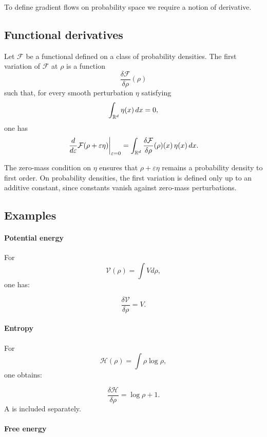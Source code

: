 To define gradient flows on probability space we require a notion of derivative.

\subsection{Functional derivatives}

\begin{definition}
Let $\mathcal F$ be a functional defined on a class of probability densities.
The first variation of $\mathcal F$ at $\rho$ is a function
\[
\frac{\delta \mathcal F}{\delta \rho}(\rho)
\]
such that, for every smooth perturbation $\eta$ satisfying
\[
\int_{\mathbb{R}^d}\eta(x)\,dx=0,
\]
one has
\[
\left.
\frac{d}{d\varepsilon}
\mathcal F(\rho+\varepsilon\eta)
\right|_{\varepsilon=0}
=
\int_{\mathbb{R}^d}
\frac{\delta \mathcal F}{\delta \rho}(\rho)(x)\,\eta(x)\,dx.
\]
\end{definition}

The zero-mass condition on $\eta$ ensures that $\rho+\varepsilon\eta$ remains a probability density to first order.
On probability densities, the first variation is defined only up to an additive constant, since constants vanish against zero-mass perturbations.

\subsection{Examples}

\paragraph{Potential energy}

For
\[
\mathcal V(\rho)=\int V d\rho,
\]
one has:

\[
\frac{\delta \mathcal V}{\delta \rho}=V.
\]

\paragraph{Entropy}

For
\[
\mathcal H(\rho)
=
\int \rho\log \rho,
\]
one obtains:

\[
\frac{\delta \mathcal H}{\delta \rho}
=
\log \rho +1.
\]
A 
is included separately.

\paragraph{Free energy}

